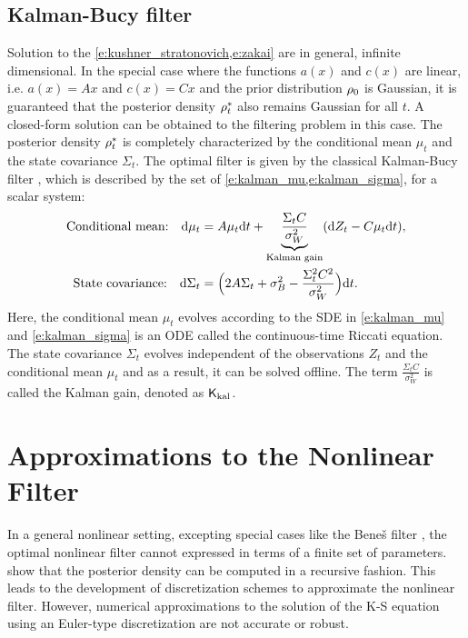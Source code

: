 \subsection{Kalman-Bucy filter}
Solution to the \cref{e:kushner_stratonovich,e:zakai} are in general, infinite dimensional. In the special case where the functions $a(x)$ and $c(x)$ are linear, i.e. $a(x) = Ax$ and $c(x) = Cx$ and the prior distribution $\rho_0$ is Gaussian, it is guaranteed that the posterior density $\rho^*_t$ also remains Gaussian for all $t$. A closed-form solution can be obtained to the filtering problem in this case. The posterior density $\rho^*_t$ is completely characterized by the conditional mean $\mu_t$ and the state covariance $\Sigma_t$. The optimal filter is given by the classical Kalman-Bucy filter \cite{kal64}, which is described by the set of \cref{e:kalman_mu,e:kalman_sigma}, for a scalar system:
\begin{align}
\text{Conditional mean:} \quad \ud \mu_t & = A \mu_t \ud t + \underbrace{\frac{\Sigma_t C}{\sigma^2_W}}_{\text{Kalman gain}} ( \ud Z_t - C \mu_t \ud t), 
\label{e:kalman_mu} \\
\text{State covariance:}  \quad  \ud \Sigma_t &= \Bigl(2 A \Sigma_t + \sigma^2_B - \frac{\Sigma^2_t C^2}{\sigma^2_W} \Bigr) \ud t. 
\label{e:kalman_sigma}
\end{align}
Here, the conditional mean $\mu_t$ evolves according to the SDE in \eqref{e:kalman_mu} and \eqref{e:kalman_sigma} is an ODE called the continuous-time Riccati equation. The state covariance $\Sigma_t$ evolves independent of the observations $Z_t$ and the conditional mean $\mu_t$ and as a result, it can be solved offline.  
The term $\frac{\Sigma_t C}{\sigma^2_W}$ is called the Kalman gain, denoted as $\sf K_{\text{kal}}$. 
\section{Approximations to the Nonlinear Filter}
\label{s:approx_nl_filter}
In a general nonlinear setting, excepting special cases like the Bene\v{s} filter \cite{ben81}, the optimal nonlinear filter cannot expressed in terms of a finite set of parameters.  show that the posterior density can be computed in a recursive fashion. This leads to the development of discretization schemes to approximate the nonlinear filter. However, numerical approximations to the solution of the K-S equation using an Euler-type discretization are not accurate or robust. 

